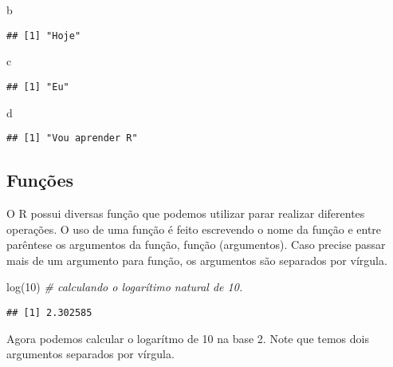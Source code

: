 \documentclass[
]{article}
\newenvironment{Shaded}{\begin{snugshade}}{\end{snugshade}}
\newcommand{\CommentTok}[1]{\textcolor[rgb]{0.56,0.35,0.01}{\textit{#1}}}
\newcommand{\DecValTok}[1]{\textcolor[rgb]{0.00,0.00,0.81}{#1}}
\newcommand{\FunctionTok}[1]{\textcolor[rgb]{0.00,0.00,0.00}{#1}}
\newcommand{\NormalTok}[1]{#1}
\begin{document}
\begin{Shaded}
\begin{Highlighting}[]
\NormalTok{b}
\end{Highlighting}
\end{Shaded}

\begin{verbatim}
## [1] "Hoje"
\end{verbatim}

\begin{Shaded}
\begin{Highlighting}[]
\NormalTok{c}
\end{Highlighting}
\end{Shaded}

\begin{verbatim}
## [1] "Eu"
\end{verbatim}

\begin{Shaded}
\begin{Highlighting}[]
\NormalTok{d}
\end{Highlighting}
\end{Shaded}

\begin{verbatim}
## [1] "Vou aprender R"
\end{verbatim}

\hypertarget{funuxe7uxf5es}{%
\subsection{Funções}\label{funuxe7uxf5es}}

O R possui diversas função que podemos utilizar parar realizar
diferentes operações. O uso de uma função é feito escrevendo o nome da
função e entre parêntese os argumentos da função, função (argumentos).
Caso precise passar mais de um argumento para função, os argumentos são
separados por vírgula.

\begin{Shaded}
\begin{Highlighting}[]
\FunctionTok{log}\NormalTok{(}\DecValTok{10}\NormalTok{) }\CommentTok{\# calculando o logarítimo natural de 10.}
\end{Highlighting}
\end{Shaded}

\begin{verbatim}
## [1] 2.302585
\end{verbatim}

Agora podemos calcular o logarítmo de 10 na base 2. Note que temos dois
argumentos separados por vírgula.
\end{document}
